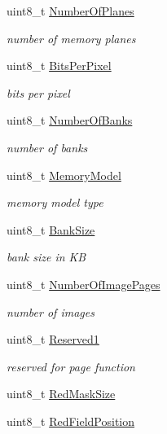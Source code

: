 \begin{DoxyCompactItemize}
uint8\+\_\+t \hyperlink{struct____attribute_____ab1471d2f75e61117d65290da9070cf89}{Number\+Of\+Planes}
\begin{DoxyCompactList}\small\item\em number of memory planes \end{DoxyCompactList}\item 
uint8\+\_\+t \hyperlink{struct____attribute_____abd9c59af53589a54188bb57ada5c5f26}{Bits\+Per\+Pixel}
\begin{DoxyCompactList}\small\item\em bits per pixel \end{DoxyCompactList}\item 
uint8\+\_\+t \hyperlink{struct____attribute_____a59483378dd87414afcde6cb3ca93c2d8}{Number\+Of\+Banks}
\begin{DoxyCompactList}\small\item\em number of banks \end{DoxyCompactList}\item 
uint8\+\_\+t \hyperlink{struct____attribute_____a0fe34321b6dfba9e784fbbc649aa193a}{Memory\+Model}
\begin{DoxyCompactList}\small\item\em memory model type \end{DoxyCompactList}\item 
uint8\+\_\+t \hyperlink{struct____attribute_____aa1307567cbc12f9c5c724b7457be14ad}{Bank\+Size}
\begin{DoxyCompactList}\small\item\em bank size in KB \end{DoxyCompactList}\item 
uint8\+\_\+t \hyperlink{struct____attribute_____a988714bc16626547fbdc31f25dfa6470}{Number\+Of\+Image\+Pages}
\begin{DoxyCompactList}\small\item\em number of images \end{DoxyCompactList}\item 
uint8\+\_\+t \hyperlink{struct____attribute_____a8ace2dfe4814abc401442986ac8a5356}{Reserved1}
\begin{DoxyCompactList}\small\item\em reserved for page function \end{DoxyCompactList}\item 
uint8\+\_\+t \hyperlink{struct____attribute_____a9ffc14e11d6b1c80b63aba344292849e}{Red\+Mask\+Size}
\item 
uint8\+\_\+t \hyperlink{struct____attribute_____a8b5b2e458757061bce7e056f7f910dae}{Red\+Field\+Position}

\end{DoxyCompactItemize}
